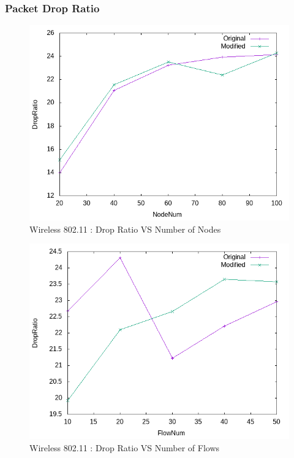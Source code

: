 \subsubsection{Packet Drop Ratio}
    \begin{figure}[!h] 
        \centering
        \includegraphics[width=.8\textwidth]{Pictures/Wireless802.11Mobile/Combined/DropRatioVSNodeNum.png}
         \caption{Wireless 802.11 : Drop Ratio VS Number of Nodes}
    \end{figure}
    
     \begin{figure}[!h] 
        \centering
        \includegraphics[width=.8\textwidth]{Pictures/Wireless802.11Mobile/Combined/DropRatioVSFlowNum.png}
         \caption{Wireless 802.11 : Drop Ratio VS Number of Flows}
    \end{figure}
    
